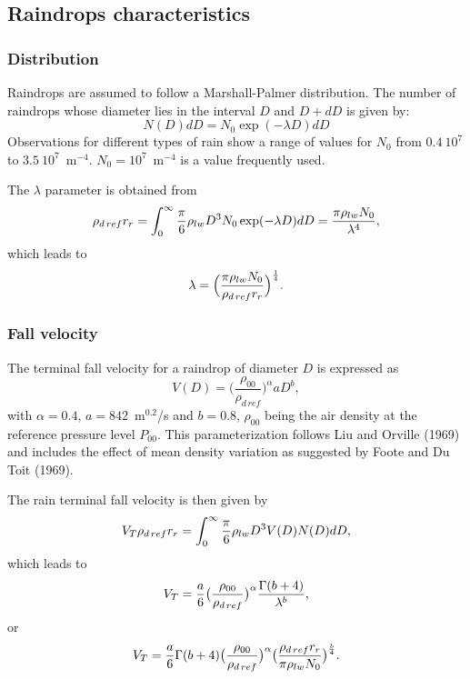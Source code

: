 \subsection{Raindrops characteristics}
\subsubsection{Distribution}
Raindrops are assumed to follow a Marshall-Palmer distribution. The number of
raindrops whose diameter lies in the interval
$D$ and $D+dD$ is given by:
\begin{equation}
N(D)dD=N_0 \exp (-\lambda D) dD
\end{equation}
Observations for different types of rain show a range of values for
$N_0$ from
$0.4\ 10^7$ to $3.5\ 10^7$~m$^{-4}$. $N_0= 10^7$~m$^{-4}$
is a value frequently used.


The $\lambda$ parameter is obtained from
\begin{equation}
 \rho_{d\,ref} r_r=\int_0^\infty {\pi \over 6} \rho_{lw} D^3 N_0 \exp(-\lambda D)dD=
{\pi \rho_{lw} N_0 \over \lambda^4},
\end{equation}
which leads to
\begin{equation}
\lambda= \Big({\pi \rho_{lw} N_0 \over \rho_{d\,ref} r_r}\Big)^{1 \over 4}.
\end{equation}
\subsubsection{Fall velocity}
The terminal fall velocity for a raindrop of diameter $D$ is expressed as
\begin{equation}
V(D)=  \big( \dfrac{ \rho_{00}}{ \rho_{d\,ref}} \big)^{\alpha} aD ^{b},
\label{eqvterm}
\end{equation}
with $\alpha=0.4$, $a=842$~m$^{0.2}$/s and $b=0.8$, $\rho_{00}$ being the air
density at the reference pressure level $P_{00}$.
This parameterization follows Liu and Orville (1969) and includes the
effect of mean density variation as suggested by Foote and Du Toit (1969).

The rain terminal fall velocity is then given by
\begin{equation}
V_T \rho_{d\,ref} r_r= \int_0^\infty {\pi \over 6} \rho_{lw} D^3 V(D) N(D)dD,
\end{equation}
which leads to
\begin{equation}
V_T = {a \over 6} \big( {\rho_{00}\over \rho_{d\,ref}}\big) ^\alpha
{\Gamma(b+4)\over \lambda ^b},
\end{equation}
or
\begin{equation}
V_T= {a \over 6} \Gamma(b+4)\big( {\rho_{00}\over \rho_{d\,ref}}\big) ^\alpha
\big( {\rho_{d\,ref} r_r \over \pi \rho_{lw} N_0}\big)
^{b \over 4}.
\end{equation}
